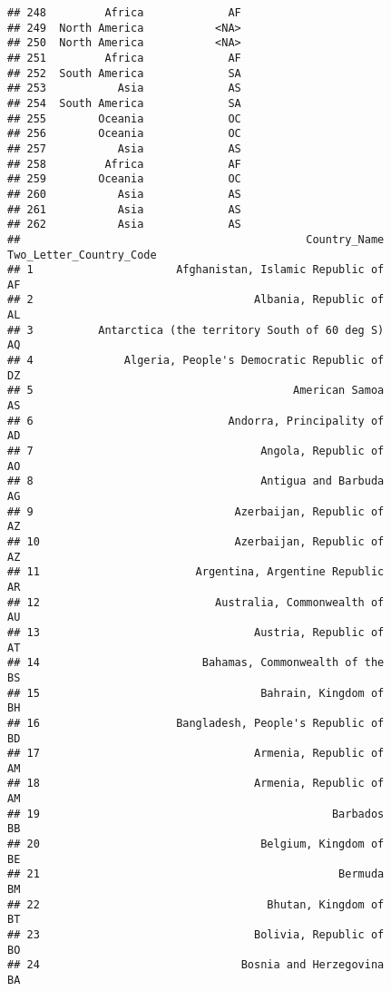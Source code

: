 \documentclass[
]{article}
\begin{document}
\begin{verbatim}
## 248         Africa             AF
## 249  North America           <NA>
## 250  North America           <NA>
## 251         Africa             AF
## 252  South America             SA
## 253           Asia             AS
## 254  South America             SA
## 255        Oceania             OC
## 256        Oceania             OC
## 257           Asia             AS
## 258         Africa             AF
## 259        Oceania             OC
## 260           Asia             AS
## 261           Asia             AS
## 262           Asia             AS
##                                            Country_Name Two_Letter_Country_Code
## 1                      Afghanistan, Islamic Republic of                      AF
## 2                                  Albania, Republic of                      AL
## 3          Antarctica (the territory South of 60 deg S)                      AQ
## 4              Algeria, People's Democratic Republic of                      DZ
## 5                                        American Samoa                      AS
## 6                              Andorra, Principality of                      AD
## 7                                   Angola, Republic of                      AO
## 8                                   Antigua and Barbuda                      AG
## 9                               Azerbaijan, Republic of                      AZ
## 10                              Azerbaijan, Republic of                      AZ
## 11                        Argentina, Argentine Republic                      AR
## 12                           Australia, Commonwealth of                      AU
## 13                                 Austria, Republic of                      AT
## 14                         Bahamas, Commonwealth of the                      BS
## 15                                  Bahrain, Kingdom of                      BH
## 16                     Bangladesh, People's Republic of                      BD
## 17                                 Armenia, Republic of                      AM
## 18                                 Armenia, Republic of                      AM
## 19                                             Barbados                      BB
## 20                                  Belgium, Kingdom of                      BE
## 21                                              Bermuda                      BM
## 22                                   Bhutan, Kingdom of                      BT
## 23                                 Bolivia, Republic of                      BO
## 24                               Bosnia and Herzegovina                      BA

\end{verbatim}
\end{document}
